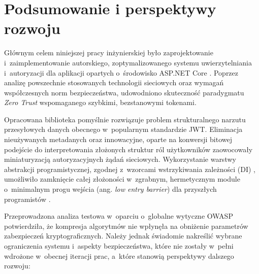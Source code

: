 \documentclass{SGGW-thesis}
\begin{document}
\startchapterfromoddpage
\chapter{Podsumowanie i perspektywy rozwoju}

Głównym celem niniejszej pracy inżynierskiej było zaprojektowanie i~zaimplementowanie autorskiego, zoptymalizowanego systemu uwierzytelniania i~autoryzacji dla aplikacji opartych o~środowisko ASP.NET Core \cite{proaspnet}. Poprzez analizę powszechnie stosowanych technologii sieciowych oraz wymagań współczesnych norm bezpieczeństwa, udowodniono skuteczność paradygmatu \textit{Zero Trust} wspomaganego szybkimi, bezstanowymi tokenami.

Opracowana biblioteka pomyślnie rozwiązuje problem strukturalnego narzutu przesyłowych danych obecnego w~popularnym standardzie JWT. Eliminacja nieużywanych metadanych oraz innowacyjne, oparte na konwersji bitowej podejście do interpretowania złożonych struktur ról użytkowników zaowocowały miniaturyzacją autoryzacyjnych żądań sieciowych. Wykorzystanie warstwy abstrakcji programistycznej, zgodnej z~wzorcami wstrzykiwania zależności (DI) \cite{di_net}, umożliwiło zamknięcie całej złożoności w~zgrabnym, hermetycznym module o~minimalnym progu wejścia (ang. \textit{low entry barrier}) dla przyszłych programistów \cite{cleancode}. 

Przeprowadzona analiza testowa w~oparciu o~globalne wytyczne OWASP \cite{owasp2021} potwierdziła, że kompresja algorytmów nie wpłynęła na obniżenie parametrów zabezpieczeń kryptograficznych. Należy jednak świadomie nakreślić wybrane ograniczenia systemu i~aspekty bezpieczeństwa, które nie zostały w~pełni wdrożone w~obecnej iteracji prac, a~które stanowią perspektywy dalszego rozwoju:
\end{document}
